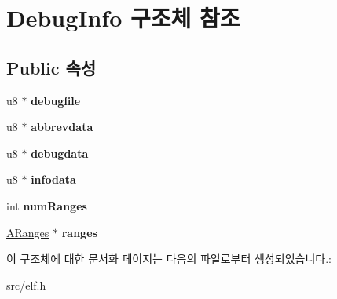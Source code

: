 \hypertarget{struct_debug_info}{}\section{Debug\+Info 구조체 참조}
\label{struct_debug_info}
\subsection*{Public 속성}
\begin{DoxyCompactItemize}
\item 
\mbox{\label{struct_debug_info_aea82946966b8b7d1ef959ae9c923a919}} 
u8 $\ast$ {\bfseries debugfile}
\item 
\mbox{\label{struct_debug_info_a4d23857bf21907f87641c4081a478f24}} 
u8 $\ast$ {\bfseries abbrevdata}
\item 
\mbox{\label{struct_debug_info_a5ee56575f46d355b29ad0a28d61c3d8a}} 
u8 $\ast$ {\bfseries debugdata}
\item 
\mbox{\label{struct_debug_info_afa6aab954bee3f4e7070c8efa6cc569f}} 
u8 $\ast$ {\bfseries infodata}
\item 
\mbox{\label{struct_debug_info_adcb1491b1a4434a104942115f82b820c}} 
int {\bfseries num\+Ranges}
\item 
\mbox{\label{struct_debug_info_ad048748b52971c0564054f85a1ed6093}} 
\mbox{\hyperlink{struct_a_ranges}{A\+Ranges}} $\ast$ {\bfseries ranges}
\end{DoxyCompactItemize}


이 구조체에 대한 문서화 페이지는 다음의 파일로부터 생성되었습니다.\+:\begin{DoxyCompactItemize}
\item 
src/elf.\+h\end{DoxyCompactItemize}
